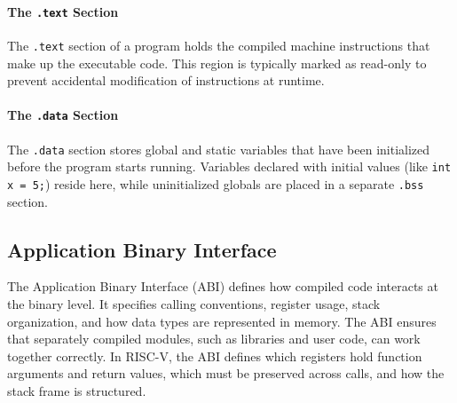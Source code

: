 \begin{center}
\end{center}

\paragraph{The \texttt{.text} Section}
The \texttt{.text} section of a program holds the compiled machine instructions
that make up the executable code. This region is typically marked as
read-only to prevent accidental modification of instructions at runtime.

\paragraph{The \texttt{.data} Section}
The \texttt{.data} section stores global and static variables that have been
initialized before the program starts running. Variables declared with
initial values (like \texttt{int x = 5;}) reside here, while uninitialized
globals are placed in a separate \texttt{.bss} section.

\subsection{Application Binary Interface}

The Application Binary Interface (ABI) defines how compiled code interacts at
the binary level. It specifies calling conventions, register usage, stack
organization, and how data types are represented in memory. The ABI ensures
that separately compiled modules, such as libraries and user code, can
work together correctly. In RISC-V, the ABI defines which registers
hold function arguments and return values, which must be preserved across
calls, and how the stack frame is structured.

